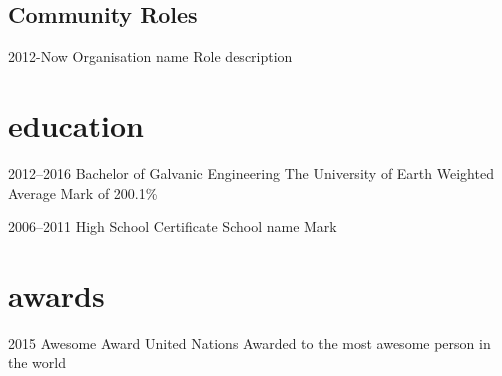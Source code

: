 \documentclass[]{friggeri-cv} %
\begin{document}


\subsection{Community Roles}

\begin{entrylist}


\entry
{2012-Now}
{Organisation name} 
{}
{Role}
{
description
}




\end{entrylist}


\section{education}

\begin{entrylist} 


\entry
{2012--2016}
{Bachelor {\normalfont of Galvanic Engineering}}
{The University of Earth}
{Weighted Average Mark of 200.1\%} 
{
}


\entry
{2006--2011}  
{High School Certificate}
{School name}
{Mark} 
{
}


\end{entrylist}


\section{awards}

\begin{entrylist}


\entry
{2015}
{Awesome Award}
{United Nations} 
{} 
{Awarded to the most awesome person in the world}



\end{entrylist}
\end{document}
